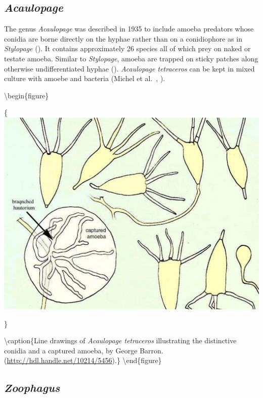 \documentclass[]{book}
\begin{document}
\hypertarget{acaulopage}{%
\subsection{\texorpdfstring{\emph{Acaulopage}}{Acaulopage}}\label{acaulopage}}

The genus \emph{Acaulopage} was described in 1935 to include amoeba predators whose conidia are borne directly on the hyphae rather than on a conidiophore as in \emph{Stylopage} (\citet{Drechsler_1935B}). It contains approximately 26 species all of which prey on naked or testate amoeba. Similar to \emph{Stylopage}, amoeba are trapped on sticky patches along otherwise undifferentiated hyphae (\citet{Drechsler_1935B}). \emph{Acaulopage tetraceros} can be kept in mixed culture with amoebe and bacteria (Michel et al.~\citeyearpar{Michel_2014}, \citeyearpar{Michel_2015}).

\textbackslash begin\{figure\}

\{\centering \includegraphics{img/Ch3_Fig3}

\}

\textbackslash caption\{Line drawings of \emph{Acaulopage tetraceros} illustrating the distinctive conidia and a captured amoeba, by George Barron. (\url{http://hdl.handle.net/10214/5456}).\}\label{fig:ch3fig3}
\textbackslash end\{figure\}

\hypertarget{zoophagus}{%
\subsection{\texorpdfstring{\emph{Zoophagus}}{Zoophagus}}\label{zoophagus}}
\end{document}

